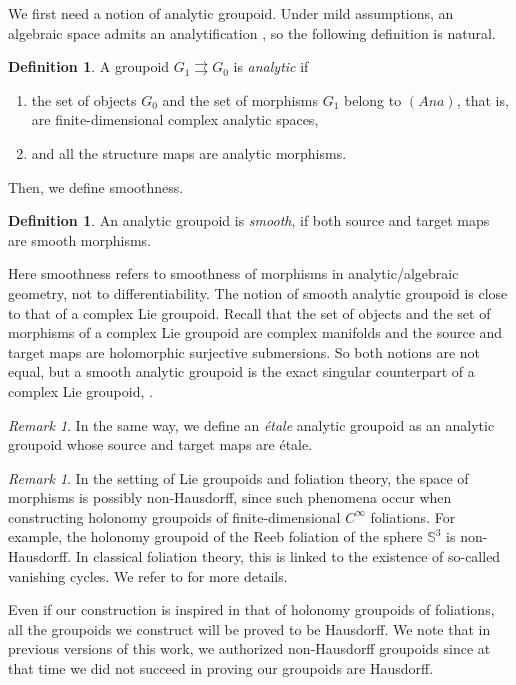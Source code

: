\documentclass[10pt]{amsart}
\newcommand{\Ana}{\mathit{Ana}}
\theoremstyle{plain}
\theoremstyle{definition}
\newtheorem{definition}[theorem]{Definition}
\theoremstyle{remark}
\newtheorem{remark}[theorem]{Remark}
\numberwithin{equation}{section}
\begin{document}
We first need a notion of analytic groupoid. Under mild assumptions, an algebraic space admits an analytification \cite[Ch.\,I, 5.17ff]{Kn}, so the following definition is natural.
\begin{definition}
\label{defanalyticgroupoid}
A groupoid $G_1\rightrightarrows G_0$ is \emph{analytic} if
\begin{enumerate}
\item
the set of objects $G_0$ and the set of morphisms $G_1$ belong to $(\Ana)$, that is, are finite-dimensional complex analytic spaces,
\item
and all the structure maps are analytic morphisms.
\end{enumerate}
\end{definition}
Then, we define smoothness.
\begin{definition}
An analytic groupoid is \emph{smooth}, if both source and target maps are smooth morphisms.
\end{definition}
Here smoothness refers to smoothness of morphisms in analytic/algebraic geometry, not to differentiability. The notion of smooth analytic groupoid is close to that of a complex Lie groupoid. Recall that the set of objects and the set of morphisms of a complex Lie groupoid are complex manifolds and the source and target maps are holomorphic surjective submersions. So both notions are not equal, but a smooth analytic groupoid is the exact singular counterpart of a complex Lie groupoid, \cf \hbox{\cite[\S 5]{Moerdijk}}.

\begin{remark}
\label{etale}
In the same way, we define an \emph{étale} analytic groupoid as an analytic groupoid whose source and target maps are étale.
\end{remark}

\begin{remark}
\label{nonHausdorff}
In the setting of Lie groupoids and foliation theory, the space of morphisms is possibly non-Hausdorff, since such phenomena occur when constructing holonomy groupoids of finite-dimensional $C^\infty$ foliations. For example, the holonomy groupoid of the Reeb foliation of the sphere $\mathbb S^3$ is non-Hausdorff. In classical foliation theory, this is linked to the existence of so-called vanishing cycles. We refer to \cite[\S 5.2]{Moerdijk} for more details.

Even if our construction is inspired in that of holonomy groupoids of foliations, all the groupoids we construct will be proved to be Hausdorff. We note that in previous versions of this work, we authorized non-Hausdorff groupoids since at that time we did not succeed in proving our groupoids are Hausdorff.
\end{remark}
\end{document}
